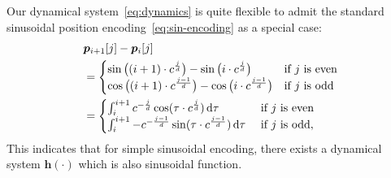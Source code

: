 \documentclass[11pt]{article}
\def\vh{{\bm{h}}}
\def\vp{{\bm{p}}}
\begin{document}
\par
Our dynamical system~\eqref{eq:dynamics} is quite flexible to admit the standard sinusoidal position encoding~\eqref{eq:sin-encoding} as a special case: 
\begin{equation}
    \label{eq:transformer-pos-enc-flow}
    \begin{aligned}
    & \vp_{i+1}[j] - \vp_{i}[j] \\
    &=\begin{cases}
    \sin\big((i+1)\cdot c^{\frac{j}{d}}\big)-\sin\big(i\cdot c^{\frac{j}{d}}\big) & \text{if $j$ is even}\\
    \cos\big((i+1)\cdot c^{\frac{j-1}{d}}\big)-\cos\big(i\cdot c^{\frac{j-1}{d}}\big)& \text{if $j$ is odd}\\
    \end{cases}\\
    &=
    \begin{cases}
    \int_i^{i+1}c^{-\frac{j}{d}}\cos(\tau\cdot  c^{\frac{j}{d}})\dif \tau & \text{ if $j$ is even}\\
    \int_i^{i+1}-c^{-\frac{j-1}{d}}\sin(\tau\cdot  c^{\frac{j-1}{d}})\dif \tau& \text{ if $j$ is odd}, 
    \end{cases}
    \end{aligned}
\end{equation}
This indicates that for simple sinusoidal encoding, there exists a dynamical system $\vh(\cdot)$ which is also sinusoidal function.
\par
\end{document}
